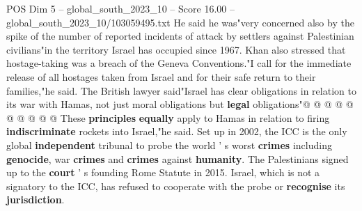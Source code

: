 \begin{textsample}{POS Dim 5 – global\_south\_2023\_10 – Score 16.00 – global\_south\_2023\_10/103059495.txt}
He said he was"very concerned also by the spike of the number of reported incidents of attack by settlers against Palestinian civilians"in the territory Israel has occupied since 1967.
Khan also stressed that hostage-taking was a breach of the Geneva Conventions."I call for the immediate release of all hostages taken from Israel and for their safe return to their families,"he said.
The British lawyer said"Israel has clear obligations in relation to its war with Hamas, not just moral obligations but \textbf{legal} obligations"@ @ @ @ @ @ @ @ @ @ These \textbf{principles} \textbf{equally} apply to Hamas in relation to firing \textbf{indiscriminate} rockets into Israel,"he said.
Set up in 2002, the ICC is the only global \textbf{independent} tribunal to probe the world ' s worst \textbf{crimes} including \textbf{genocide}, war \textbf{crimes} and \textbf{crimes} against \textbf{humanity}.
The Palestinians signed up to the \textbf{court} ' s founding Rome Statute in 2015.
Israel, which is not a signatory to the ICC, has refused to cooperate with the probe or \textbf{recognise} its \textbf{jurisdiction}.

\end{textsample}

